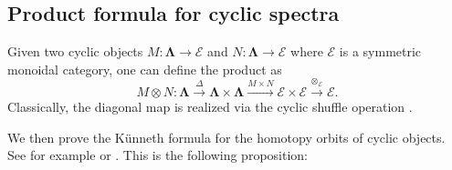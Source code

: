 \documentclass[11pt]{amsart}
\numberwithin{equation}{section}
\theoremstyle{plain}
\theoremstyle{definition}
\theoremstyle{remark}
\newcommand{\cE} { {\mathcal{E}}}
\begin{document}
 \subsection{Product formula for cyclic spectra}\label{section: Künneth in general}
Given two cyclic objects $M: \boldsymbol{\Lambda} \rightarrow \cE$ and $N: \boldsymbol{\Lambda} \rightarrow \cE$ where $\cE$ is a symmetric monoidal category, one can define the product as 
\[M \otimes N: \boldsymbol{\Lambda}\xrightarrow{\Delta}\boldsymbol{\Lambda}\times \boldsymbol{\Lambda} \xrightarrow{M \times N} \cE \times \cE \xrightarrow{\otimes_\cE} \cE.\]
Classically, the diagonal map is realized via the cyclic shuffle operation \cite[Chapter 4]{LodayCyclic} \cite{Getzler-Jones}.


We then prove the K\"unneth formula for the homotopy orbits of cyclic objects. See for example \cite[Theorem 4.3.11]{LodayCyclic} or \cite[Theorem 7.29 \& 7.43]{MNN_nilpotence_equivariant_homotopy}. This is the following proposition:
\end{document}
